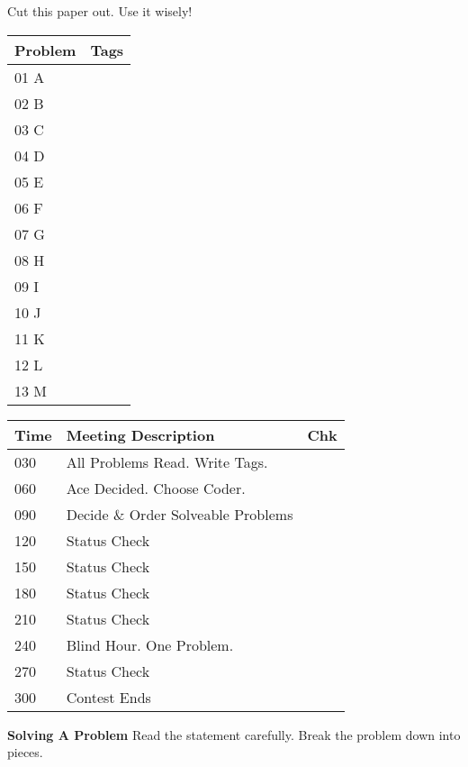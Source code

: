 Cut this paper out. Use it wisely!

\begin{tabular}{| l || m{6cm} | }
	\hline
	\textbf{Problem} & \textbf{Tags}\\	\hline
	01 A & \\	\hline
	02 B & \\	\hline
	03 C & \\	\hline
	04 D & \\	\hline
	05 E & \\	\hline
	06 F & \\	\hline
	07 G & \\	\hline
	08 H & \\	\hline
	09 I & \\	\hline
	10 J & \\	\hline
	11 K & \\	\hline
	12 L & \\	\hline
	13 M & \\	\hline
\end{tabular}
\newline\newline\newline
\begin{tabular}{| l | l || m{7mm}| }
	\hline
	\textbf{Time} & \textbf{Meeting Description} & \textbf{Chk} \\	\hline
	030 & All Problems Read. Write Tags. & 	\\	\hline
	060 & Ace Decided. Choose Coder.	&	\\	\hline
	090 & Decide \& Order Solveable Problems &	\\	\hline
	120 & Status Check &	\\	\hline
	150 & Status Check &	\\	\hline
	180 & Status Check &	\\	\hline
	210 & Status Check &	\\	\hline
	240 & Blind Hour. One Problem. &	\\	\hline
	270 & Status Check &	\\	\hline
	300 & Contest Ends &	\\	\hline
\end{tabular}
\newline\newline\newline
\textbf{\large{Solving A Problem}}\newline
Read the statement carefully.\newline
Break the problem down into pieces.\newline

